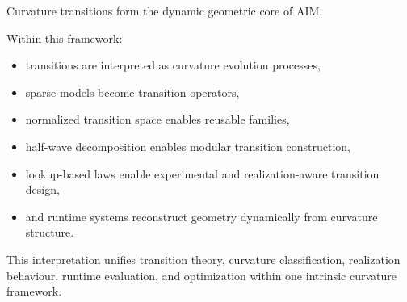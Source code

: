 \begin{summary}
Curvature transitions form the dynamic geometric core of AIM.

Within this framework:
\begin{itemize}
\item transitions are interpreted as curvature evolution processes,
\item sparse models become transition operators,
\item normalized transition space enables reusable families,
\item half-wave decomposition enables modular transition construction,
\item lookup-based laws enable experimental and realization-aware
transition design,
\item and runtime systems reconstruct geometry dynamically from
curvature structure.
\end{itemize}

This interpretation unifies transition theory, curvature classification,
realization behaviour, runtime evaluation, and optimization within one
intrinsic curvature framework.
\end{summary}
